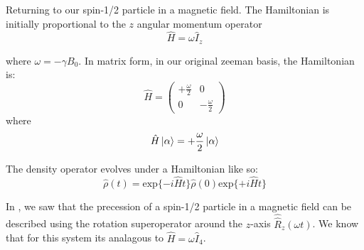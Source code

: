 Returning to our spin-1/2 particle in a magnetic field. The Hamiltonian is initially
proportional to the $z$ angular momentum operator
\begin{equation}
  \hat{H} = \omega\hat{I}_z
\end{equation}

where $\omega = -\gamma B_0$. In matrix form, in our original zeeman basis, the Hamiltonian is:
\begin{equation}
  \hat{H} = \begin{pmatrix}
+\frac{\omega}{2} & 0\\
0 & -\frac{\omega}{2}
\end{pmatrix}
\end{equation}
where
\begin{equation}
  \hat{H}\ket{\alpha} = +\frac{\omega}{2}\ket{\alpha}
\end{equation}

The density operator evolves under a Hamiltonian like so:
\begin{equation}
  \hat\rho(t) = \text{exp}\{-i\hat{H}t\}\hat\rho(0)\text{exp}\{+i\hat{H}t\}
\end{equation}

In , we saw that the precession of a spin-1/2 particle in a magnetic field can be described using the rotation superoperator around the $z$-axis $\hat{\hat{R}}_z(\omega t)$. We know that for this system its analagous to $\hat{H} = \omega\hat{I}_4$.

